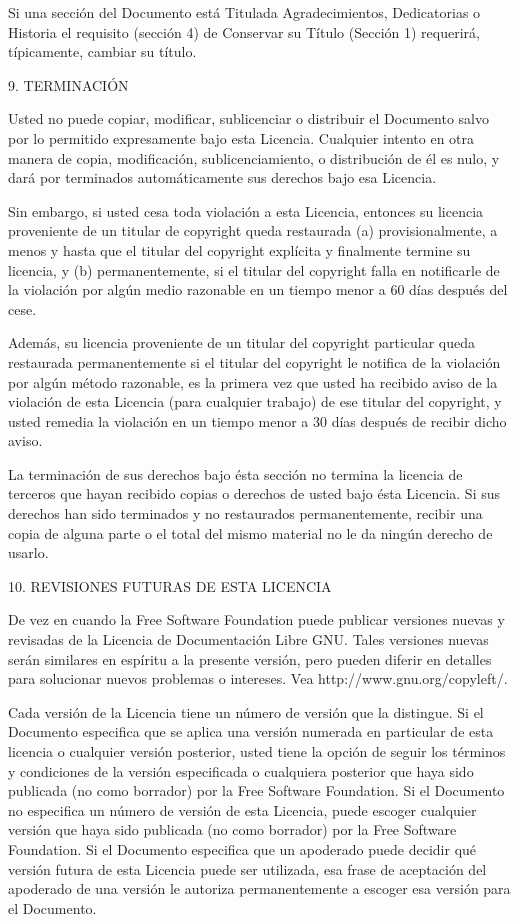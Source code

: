 \documentclass[a4paper, 11pt, oneside]{report}
\begin{document}
Si una sección del Documento está Titulada Agradecimientos, Dedicatorias o Historia el requisito (sección 4) de Conservar su Título (Sección 1) requerirá, típicamente, cambiar su título.

9. TERMINACIÓN

Usted no puede copiar, modificar, sublicenciar o distribuir el Documento salvo por lo permitido expresamente bajo esta Licencia. Cualquier intento en otra manera de copia, modificación, sublicenciamiento, o distribución de él es nulo, y dará por terminados automáticamente sus derechos bajo esa Licencia.

Sin embargo, si usted cesa toda violación a esta Licencia, entonces su licencia proveniente de un titular de copyright queda restaurada (a) provisionalmente, a menos y hasta que el titular del copyright explícita y finalmente termine su licencia, y (b) permanentemente, si el titular del copyright falla en notificarle de la violación por algún medio razonable en un tiempo menor a 60 días después del cese.

Además, su licencia proveniente de un titular del copyright particular queda restaurada permanentemente si el titular del copyright le notifica de la violación por algún método razonable, es la primera vez que usted ha recibido aviso de la violación de esta Licencia (para cualquier trabajo) de ese titular del copyright, y usted remedia la violación en un tiempo menor a 30 días después de recibir dicho aviso.

La terminación de sus derechos bajo ésta sección no termina la licencia de terceros que hayan recibido copias o derechos de usted bajo ésta Licencia. Si sus derechos han sido terminados y no restaurados permanentemente, recibir una copia de alguna parte o el total del mismo material no le da ningún derecho de usarlo.

10. REVISIONES FUTURAS DE ESTA LICENCIA

De vez en cuando la Free Software Foundation puede publicar versiones nuevas y revisadas de la Licencia de Documentación Libre GNU. Tales versiones nuevas serán similares en espíritu a la presente versión, pero pueden diferir en detalles para solucionar nuevos problemas o intereses. Vea http://www.gnu.org/copyleft/.

Cada versión de la Licencia tiene un número de versión que la distingue. Si el Documento especifica que se aplica una versión numerada en particular de esta licencia o cualquier versión posterior, usted tiene la opción de seguir los términos y condiciones de la versión especificada o cualquiera posterior que haya sido publicada (no como borrador) por la Free Software Foundation. Si el Documento no especifica un número de versión de esta Licencia, puede escoger cualquier versión que haya sido publicada (no como borrador) por la Free Software Foundation. Si el Documento especifica que un apoderado puede decidir qué versión futura de esta Licencia puede ser utilizada, esa frase de aceptación del apoderado de una versión le autoriza permanentemente a escoger esa versión para el Documento.
\end{document}
